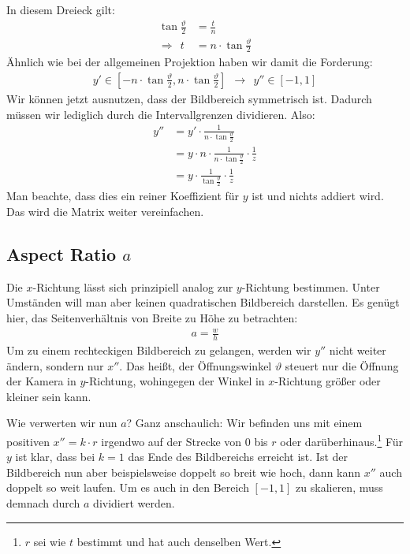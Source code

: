 \documentclass[a4paper,parskip=full*]{scrartcl}
\begin{document}
In diesem Dreieck gilt:
\begin{align*}
	\tan \frac{\vartheta}{2} &= \frac{t}{n}  \\
	\Rightarrow ~~ t &= n \cdot \tan \frac{\vartheta}{2}
\end{align*}
Ähnlich wie bei der allgemeinen Projektion haben wir damit die
Forderung:
\begin{align*}
	y' \in [-n \cdot \tan \frac{\vartheta}{2}, n \cdot \tan \frac{\vartheta}{2}]  ~~  \rightarrow  ~~  y'' \in [-1, 1]
\end{align*}
Wir können jetzt ausnutzen, dass der Bildbereich symmetrisch ist.
Dadurch müssen wir lediglich durch die Intervallgrenzen dividieren.
Also:
\begin{align*}
	y'' &= y' \cdot \frac{1}{n \cdot \tan \frac{\vartheta}{2}}  \\
	    &= y \cdot n \cdot \frac{1}{n \cdot \tan \frac{\vartheta}{2}} \cdot \frac{1}{z}  \\
	    &= y \cdot \frac{1}{\tan \frac{\vartheta}{2}} \cdot \frac{1}{z}
\end{align*}
Man beachte, dass dies ein reiner Koeffizient für $y$ ist und nichts
addiert wird. Das wird die Matrix weiter vereinfachen.

\subsection{Aspect Ratio $a$}
Die $x$-Richtung lässt sich prinzipiell analog zur $y$-Richtung
bestimmen. Unter Umständen will man aber keinen quadratischen
Bildbereich darstellen. Es genügt hier, das Seitenverhältnis von Breite
zu Höhe zu betrachten:
\begin{align*}
	a = \frac{w}{h}
\end{align*}
Um zu einem rechteckigen Bildbereich zu gelangen, werden wir $y''$ nicht
weiter ändern, sondern nur $x''$. Das heißt, der Öffnungswinkel
$\vartheta$ steuert nur die Öffnung der Kamera in $y$-Richtung,
wohingegen der Winkel in $x$-Richtung größer oder kleiner sein kann.

Wie verwerten wir nun $a$? Ganz anschaulich: Wir befinden uns mit einem
positiven $x'' = k \cdot r$ irgendwo auf der Strecke von $0$ bis $r$
oder darüberhinaus.\footnote{$r$ sei wie $t$ bestimmt und hat auch
denselben Wert.} Für $y$ ist klar, dass bei $k = 1$ das Ende des
Bildbereichs erreicht ist. Ist der Bildbereich nun aber beispielsweise
doppelt so breit wie hoch, dann kann $x''$ auch doppelt so weit laufen.
Um es auch in den Bereich $[-1, 1]$ zu skalieren, muss demnach durch $a$
dividiert werden.
\end{document}
